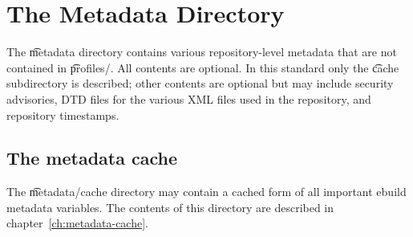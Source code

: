 \section{The Metadata Directory}
\label{sec:metadata-dir}

The \t{metadata} directory contains various repository-level metadata that are not contained in
\t{profiles/}. All contents are optional. In this standard only the \t{cache} subdirectory is
described; other contents are optional but may include security advisories, DTD files for the
various XML files used in the repository, and repository timestamps.

\subsection{The metadata cache}

The \t{metadata/cache} directory may contain a cached form of all important ebuild metadata
variables. The contents of this directory are described in chapter~\ref{ch:metadata-cache}.


